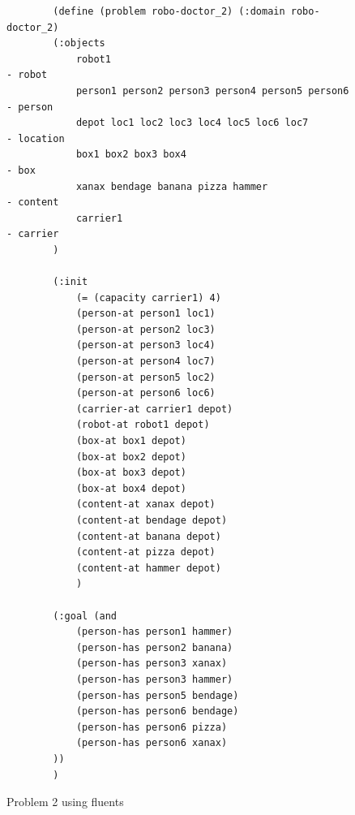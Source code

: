 \begin{figure}
    \begin{verbatim}
        (define (problem robo-doctor_2) (:domain robo-doctor_2)
        (:objects 
            robot1                                              - robot
            person1 person2 person3 person4 person5 person6     - person
            depot loc1 loc2 loc3 loc4 loc5 loc6 loc7            - location
            box1 box2 box3 box4                                 - box
            xanax bendage banana pizza hammer                   - content
            carrier1                                            - carrier
        )

        (:init
            (= (capacity carrier1) 4)
            (person-at person1 loc1)
            (person-at person2 loc3)
            (person-at person3 loc4)
            (person-at person4 loc7)
            (person-at person5 loc2)
            (person-at person6 loc6)
            (carrier-at carrier1 depot)
            (robot-at robot1 depot)
            (box-at box1 depot)
            (box-at box2 depot)
            (box-at box3 depot)
            (box-at box4 depot)
            (content-at xanax depot)
            (content-at bendage depot)
            (content-at banana depot)
            (content-at pizza depot)
            (content-at hammer depot)
            )

        (:goal (and
            (person-has person1 hammer)
            (person-has person2 banana)
            (person-has person3 xanax)
            (person-has person3 hammer)
            (person-has person5 bendage)
            (person-has person6 bendage)
            (person-has person6 pizza)
            (person-has person6 xanax)
        ))
        )
    \end{verbatim}
    \caption{Problem 2 using fluents}
    \label{problem2_plan_fluents}
\end{figure}

